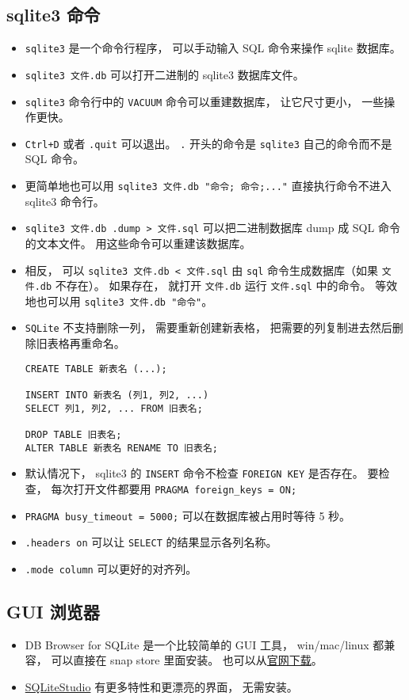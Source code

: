 \subsection{sqlite3 命令}
\begin{itemize}
\item \verb|sqlite3| 是一个命令行程序， 可以手动输入 SQL 命令来操作 sqlite 数据库。
\item \verb|sqlite3 文件.db| 可以打开二进制的 sqlite3 数据库文件。
\item \verb|sqlite3| 命令行中的 \verb|VACUUM| 命令可以重建数据库， 让它尺寸更小， 一些操作更快。
\item \verb|Ctrl+D| 或者 \verb|.quit| 可以退出。 \verb|.| 开头的命令是 \verb|sqlite3| 自己的命令而不是 SQL 命令。
\item 更简单地也可以用 \verb|sqlite3 文件.db "命令; 命令;..."| 直接执行命令不进入 sqlite3 命令行。
\item \verb|sqlite3 文件.db .dump > 文件.sql| 可以把二进制数据库 dump 成 SQL 命令的文本文件。 用这些命令可以重建该数据库。
\item 相反， 可以 \verb|sqlite3 文件.db < 文件.sql| 由 \verb|sql| 命令生成数据库（如果 \verb|文件.db| 不存在）。 如果存在， 就打开 \verb|文件.db| 运行 \verb|文件.sql| 中的命令。 等效地也可以用 \verb|sqlite3 文件.db "命令"|。
\item \verb|SQLite| 不支持删除一列， 需要重新创建新表格， 把需要的列复制进去然后删除旧表格再重命名。
\begin{lstlisting}[language=none]
CREATE TABLE 新表名 (...);

INSERT INTO 新表名 (列1, 列2, ...)
SELECT 列1, 列2, ... FROM 旧表名;

DROP TABLE 旧表名;
ALTER TABLE 新表名 RENAME TO 旧表名;
\end{lstlisting}
\item 默认情况下， sqlite3 的 \verb|INSERT| 命令不检查 \verb|FOREIGN KEY| 是否存在。 要检查， 每次打开文件都要用 \verb|PRAGMA foreign_keys = ON;|
\item \verb|PRAGMA busy_timeout = 5000;| 可以在数据库被占用时等待 5 秒。
\item \verb|.headers on| 可以让 \verb|SELECT| 的结果显示各列名称。
\item \verb|.mode column| 可以更好的对齐列。
\end{itemize}

\subsection{GUI 浏览器}
\begin{itemize}
\item DB Browser for SQLite 是一个比较简单的 GUI 工具， win/mac/linux 都兼容， 可以直接在 snap store 里面安装。 也可以从\href{https://sqlitebrowser.org/dl/}{官网下载}。
\item \href{https://sqlitestudio.pl/}{SQLiteStudio} 有更多特性和更漂亮的界面， 无需安装。
\end{itemize}

